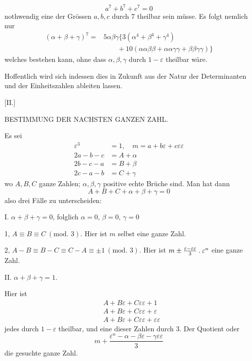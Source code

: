 %
\[
a^7+b^7+c^7=0
\]
nothwendig eine der Grössen $a,b,c$ durch $7$ theilbar sein müsse. Es folgt nemlich nur
\[
\begin{aligned}
(\alpha+\beta+\gamma)^7={}&5\alpha\beta\gamma\{3(\alpha^4+\beta^4+\gamma^4)\\
&\qquad+10(\alpha\alpha\beta\beta+\alpha\alpha\gamma\gamma+\beta\beta\gamma\gamma)\}
\end{aligned}
\]
welches bestehen kann, ohne dass $\alpha,\beta,\gamma$ durch $1-\varepsilon$ theilbar wäre.

Hoffentlich wird sich indessen dies in Zukunft aus der Natur der Determinanten und der Einheitszahlen ableiten lassen.

\begin{center}[II.]\par\medskip
BESTIMMUNG DER NACHSTEN GANZEN ZAHL.
\end{center}
Es sei
\[
\begin{aligned}
\varepsilon^3&=1,\quad m=a+b\varepsilon+c\varepsilon\varepsilon\\
2a-b-c&=A+\alpha\\
2b-c-a&=B+\beta\\
2c-a-b&=C+\gamma
\end{aligned}
\]
wo $A,B,C$ ganze Zahlen; $\alpha,\beta,\gamma$ positive echte Brüche sind. Man hat dann
\[
A+B+C+\alpha+\beta+\gamma=0
\]
also drei Fälle zu unterscheiden:

I. $\alpha+\beta+\gamma=0$, folglich $\alpha=0$, $\beta=0$, $\gamma=0$

1, $A\equiv B\equiv C\ (\text{mod. }3)$. Hier ist $m$ selbst eine ganze Zahl.

2, $A-B\equiv B-C\equiv C-A\equiv\pm1\ (\text{mod. }3)$. Hier ist $m\pm\frac{\varepsilon-\varepsilon\varepsilon}{3}\mathbin{.}\varepsilon^n$ eine ganze Zahl.

II. $\alpha+\beta+\gamma=1$.

Hier ist
\[
\begin{aligned}
&A+B\varepsilon+C\varepsilon\varepsilon+1\\
&A+B\varepsilon+C\varepsilon\varepsilon+\varepsilon\\
&A+B\varepsilon+C\varepsilon\varepsilon+\varepsilon\varepsilon
\end{aligned}
\]
%
jedes durch $1-\varepsilon$ theilbar, und eine dieser Zahlen durch $3$. Der Quotient oder
\[
m+\frac{\varepsilon^n-\alpha-\beta\varepsilon-\gamma\varepsilon\varepsilon}{3}
\]
die gesuchte ganze Zahl.

